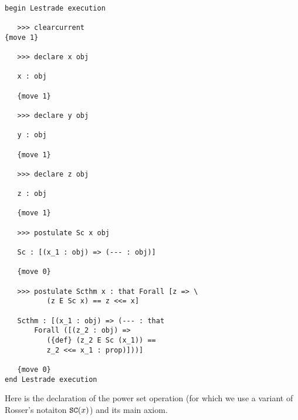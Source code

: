 \documentclass[12pt]{article}
\begin{document}
\begin{verbatim}

begin Lestrade execution

   >>> clearcurrent
{move 1}

   >>> declare x obj

   x : obj

   {move 1}

   >>> declare y obj

   y : obj

   {move 1}

   >>> declare z obj

   z : obj

   {move 1}

   >>> postulate Sc x obj

   Sc : [(x_1 : obj) => (--- : obj)]

   {move 0}

   >>> postulate Scthm x : that Forall [z => \
          (z E Sc x) == z <<= x]

   Scthm : [(x_1 : obj) => (--- : that 
       Forall ([(z_2 : obj) => 
          ({def} (z_2 E Sc (x_1)) == 
          z_2 <<= x_1 : prop)]))]

   {move 0}
end Lestrade execution
\end{verbatim}

Here is the declaration of the power set operation (for which we use a variant of Rosser's notaiton ${\tt SC}(x)$) and its main axiom.
\end{document}
